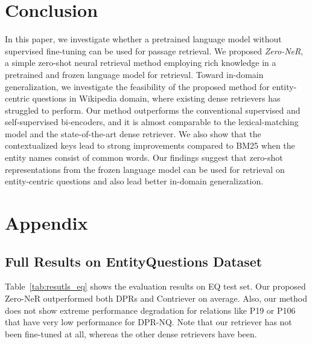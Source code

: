 \documentclass[letterpaper]{article} \usepackage{aaai23}  \usepackage{times}  \usepackage{helvet}  \usepackage{courier}  \usepackage[hyphens]{url}  \usepackage{graphicx} \urlstyle{rm} \def\UrlFont{\rm}  \usepackage{natbib}  \usepackage{caption} \frenchspacing  \setlength{\pdfpagewidth}{8.5in}  \setlength{\pdfpageheight}{11in}  \usepackage{algorithm}
\begin{document}
\section{Conclusion}
In this paper, we investigate whether a pretrained language model without supervised fine-tuning can be used for passage retrieval.
We proposed \textit{Zero-NeR}, a simple zero-shot neural retrieval method employing rich knowledge in a pretrained and frozen language model for retrieval.
Toward in-domain generalization, we investigate the feasibility of the proposed method for entity-centric questions in Wikipedia domain, where existing dense retrievers has struggled to perform.
Our method outperforms the conventional supervised and self-supervised bi-encoders, and it is almost comparable to the lexical-matching model and the state-of-the-art dense retriever.
We also show that the contextualized keys lead to strong improvements compared to BM25 when the entity names consist of common words.
Our findings suggest that zero-shot representations from the frozen language model can be used for retrieval on entity-centric questions and also lead better in-domain generalization.

















\appendix
\section{Appendix}\label{sec:appendix}


\subsection{Full Results on EntityQuestions Dataset}\label{sec:appendix_full_results}
Table~\ref{tab:resutls_eq} shows the evaluation results on EQ test set.
Our proposed Zero-NeR outperformed both DPRs and Contriever on average.
Also, our method does not show extreme performance degradation for relations like P19 or P106 that have very low performance for DPR-NQ.
Note that our retriever has not been fine-tuned at all, whereas the other dense retrievers have been.
\end{document}
